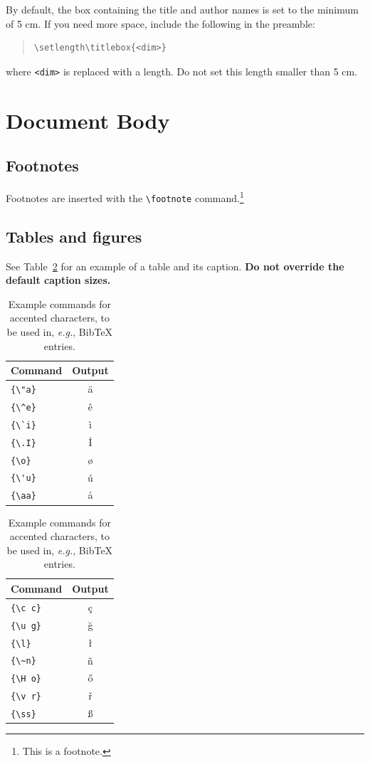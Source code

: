 \documentclass[11pt]{article}
\begin{document}
By default, the box containing the title and author names is set to the minimum of 5 cm. If you need more space, include the following in the preamble:
\begin{quote}
\begin{verbatim}
\setlength\titlebox{<dim>}
\end{verbatim}
\end{quote}
where \verb|<dim>| is replaced with a length. Do not set this length smaller than 5 cm.

\section{Document Body}

\subsection{Footnotes}

Footnotes are inserted with the \verb|\footnote| command.\footnote{This is a footnote.}

\subsection{Tables and figures}

See Table~\ref{tab:accents} for an example of a table and its caption.
\textbf{Do not override the default caption sizes.}

\begin{table}
  \centering
  \begin{tabular}{lc}
    \hline
    \textbf{Command} & \textbf{Output} \\
    \hline
    \verb|{\"a}|     & {\"a}           \\
    \verb|{\^e}|     & {\^e}           \\
    \verb|{\`i}|     & {\`i}           \\
    \verb|{\.I}|     & {\.I}           \\
    \verb|{\o}|      & {\o}            \\
    \verb|{\'u}|     & {\'u}           \\
    \verb|{\aa}|     & {\aa}           \\\hline
  \end{tabular}
  \begin{tabular}{lc}
    \hline
    \textbf{Command} & \textbf{Output} \\
    \hline
    \verb|{\c c}|    & {\c c}          \\
    \verb|{\u g}|    & {\u g}          \\
    \verb|{\l}|      & {\l}            \\
    \verb|{\~n}|     & {\~n}           \\
    \verb|{\H o}|    & {\H o}          \\
    \verb|{\v r}|    & {\v r}          \\
    \verb|{\ss}|     & {\ss}           \\
    \hline
  \end{tabular}
  \caption{Example commands for accented characters, to be used in, \emph{e.g.}, Bib\TeX{} entries.}
  \label{tab:accents}
\end{table}
\end{document}
